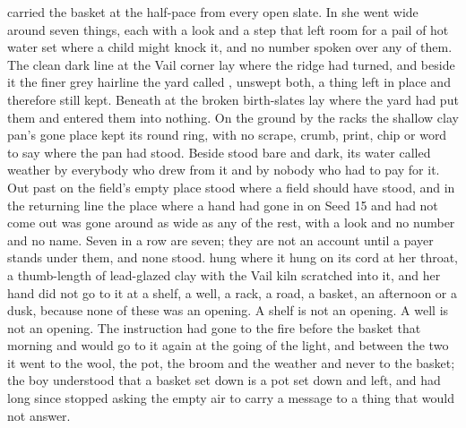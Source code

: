  carried the basket at the half-pace from every open slate. In  she went wide around seven things, each with a look and a step that left room for a pail of hot water set where a child might knock it, and no number spoken over any of them. The clean dark line at the Vail corner lay where the  ridge had turned, and beside it the finer grey hairline the yard called , unswept both, a thing left in place and therefore still kept. Beneath  at  the broken birth-slates lay where the yard had put them and entered them into nothing. On the ground by the racks the shallow clay pan's gone place kept its round ring, with no scrape, crumb, print, chip or word to say where the pan had stood. Beside   stood bare and dark, its water called weather by everybody who drew from it and by nobody who had to pay for it. Out past  on  the field's empty place stood where a field should have stood, and in the returning line the place where a hand had gone in on Seed 15 and had not come out was gone around as wide as any of the rest, with a look and no number and no name. Seven in a row are seven; they are not an account until a payer stands under them, and none stood.  hung where it hung on its cord at her throat, a thumb-length of lead-glazed clay with the Vail kiln scratched into it, and her hand did not go to it at a shelf, a well, a rack, a road, a basket, an afternoon or a dusk, because none of these was an opening. A shelf is not an opening. A well is not an opening. The instruction had gone to the fire before the basket that morning and would go to it again at the going of the light, and between the two it went to the wool, the pot, the broom and the weather and never to the basket; the boy understood that a basket set down is a pot set down and left, and had long since stopped asking the empty air to carry a message to a thing that would not answer.

\scenebreak

